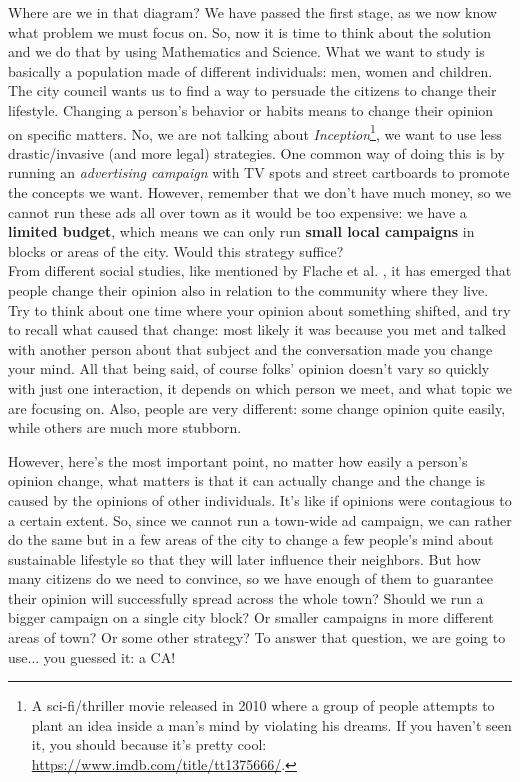 Where are we in that diagram? We have passed the first stage, as we now know what problem we must focus
on. So, now it is time to think about the solution and we do that by using Mathematics and Science. What we
want to study is basically a population made of different individuals: men, women and children.
The city council wants us to find a way to persuade the citizens to change their lifestyle. Changing
a person's behavior or habits means to change their opinion on specific matters. No, we are not talking
about \textit{Inception}\footnote{A sci-fi/thriller movie released in 2010 where a group
of people attempts to plant an idea inside a man's mind by violating his dreams. 
If you haven't seen
it, you should because it's pretty cool: \url{https://www.imdb.com/title/tt1375666/}.}, we want to
use less drastic/invasive (and more legal) strategies. One common way of doing this is by
running an \textit{advertising campaign} with TV spots and street cartboards to promote
the concepts we want. However, remember that we don't have much money, so we cannot run these ads all
over town as it would be too expensive: we have a \textbf{limited budget}, which means we can only run
\textbf{small local campaigns} in blocks or areas of the city. Would this strategy suffice?\\

From different social studies, like mentioned by Flache et al. \cite{flache-opinion},
it has emerged that people change their opinion also in relation to
the community where they live. Try to think about one time where your opinion about something shifted,
and try to recall what caused that change: most likely it was because you met and talked with another
person about that subject and the conversation made you change your mind. All that being said,
of course folks' opinion doesn't vary so quickly with just one interaction, it depends
on which person we meet, and what topic we are focusing on. Also, people are very different: some
change opinion quite easily, while others are much more stubborn.

However, here's the most important point, no matter how easily a person's opinion change, what matters
is that it can actually change and the change is caused by the opinions of other individuals. It's like
if opinions were contagious to a certain extent. So, since we cannot run a town-wide ad campaign, we can
rather do the same but in a few areas of the city to change a few people's mind
about sustainable lifestyle so that they will later influence their neighbors. But how many citizens
do we need to convince, so we have enough of them to guarantee their opinion will successfully spread
across the whole town?
Should we run a bigger campaign on a single city block? Or smaller campaigns in more different areas
of town? Or some other strategy?
To answer that question, we are going to use... you guessed it: a CA!\\

